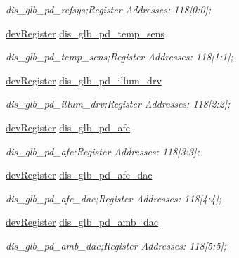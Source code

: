 \begin{DoxyCompactItemize}
\begin{DoxyCompactList}\small\item\em dis\+\_\+glb\+\_\+pd\+\_\+refsys;Register Addresses\+: 118\mbox{[}0\+:0\mbox{]}; \end{DoxyCompactList}\item 
\mbox{\hyperlink{classdev_register}{dev\+Register}} \mbox{\hyperlink{class_o_p_t3101_registers_a2b4aae9a7d8062c5893bb8a4a8716255}{dis\+\_\+glb\+\_\+pd\+\_\+temp\+\_\+sens}}
\begin{DoxyCompactList}\small\item\em dis\+\_\+glb\+\_\+pd\+\_\+temp\+\_\+sens;Register Addresses\+: 118\mbox{[}1\+:1\mbox{]}; \end{DoxyCompactList}\item 
\mbox{\hyperlink{classdev_register}{dev\+Register}} \mbox{\hyperlink{class_o_p_t3101_registers_aa20afc6b01676f3427fec05f5f70af86}{dis\+\_\+glb\+\_\+pd\+\_\+illum\+\_\+drv}}
\begin{DoxyCompactList}\small\item\em dis\+\_\+glb\+\_\+pd\+\_\+illum\+\_\+drv;Register Addresses\+: 118\mbox{[}2\+:2\mbox{]}; \end{DoxyCompactList}\item 
\mbox{\hyperlink{classdev_register}{dev\+Register}} \mbox{\hyperlink{class_o_p_t3101_registers_aa78dfbdc7b8d538de989502f6cef32a3}{dis\+\_\+glb\+\_\+pd\+\_\+afe}}
\begin{DoxyCompactList}\small\item\em dis\+\_\+glb\+\_\+pd\+\_\+afe;Register Addresses\+: 118\mbox{[}3\+:3\mbox{]}; \end{DoxyCompactList}\item 
\mbox{\hyperlink{classdev_register}{dev\+Register}} \mbox{\hyperlink{class_o_p_t3101_registers_a414604fc5fb4c494a769b13748bb7392}{dis\+\_\+glb\+\_\+pd\+\_\+afe\+\_\+dac}}
\begin{DoxyCompactList}\small\item\em dis\+\_\+glb\+\_\+pd\+\_\+afe\+\_\+dac;Register Addresses\+: 118\mbox{[}4\+:4\mbox{]}; \end{DoxyCompactList}\item 
\mbox{\hyperlink{classdev_register}{dev\+Register}} \mbox{\hyperlink{class_o_p_t3101_registers_a6bbf1f0856d86847576e5aa8476434e1}{dis\+\_\+glb\+\_\+pd\+\_\+amb\+\_\+dac}}
\begin{DoxyCompactList}\small\item\em dis\+\_\+glb\+\_\+pd\+\_\+amb\+\_\+dac;Register Addresses\+: 118\mbox{[}5\+:5\mbox{]}; \end{DoxyCompactList}\item 

\end{DoxyCompactItemize}
